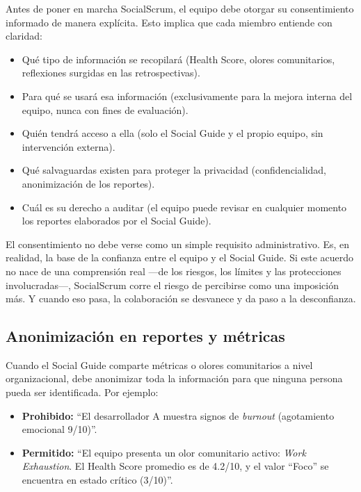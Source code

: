 Antes de poner en marcha SocialScrum, el equipo debe otorgar su consentimiento informado de manera explícita. Esto implica que cada miembro entiende con claridad:

\begin{itemize}
    \item Qué tipo de información se recopilará (Health Score, olores comunitarios, reflexiones surgidas en las retrospectivas).
    \item Para qué se usará esa información (exclusivamente para la mejora interna del equipo, nunca con fines de evaluación).
    \item Quién tendrá acceso a ella (solo el Social Guide y el propio equipo, sin intervención externa).
    \item Qué salvaguardas existen para proteger la privacidad (confidencialidad, anonimización de los reportes).
    \item Cuál es su derecho a auditar (el equipo puede revisar en cualquier momento los reportes elaborados por el Social Guide).
\end{itemize}

El consentimiento no debe verse como un simple requisito administrativo. Es, en realidad, la base de la confianza entre el equipo y el Social Guide. Si este acuerdo no nace de una comprensión real —de los riesgos, los límites y las protecciones involucradas—, SocialScrum corre el riesgo de percibirse como una imposición más. Y cuando eso pasa, la colaboración se desvanece y da paso a la desconfianza.

\subsection{Anonimización en reportes y métricas}

Cuando el Social Guide comparte métricas o olores comunitarios a nivel organizacional, debe anonimizar toda la información para que ninguna persona pueda ser identificada. Por ejemplo:

\begin{itemize}
    \item \textbf{Prohibido:} ``El desarrollador A muestra signos de \textit{burnout} (agotamiento emocional 9/10)''.
    \item \textbf{Permitido:} ``El equipo presenta un olor comunitario activo: \textit{Work Exhaustion}. El Health Score promedio es de 4.2/10, y el valor ``Foco'' se encuentra en estado crítico (3/10)''.
\end{itemize}


